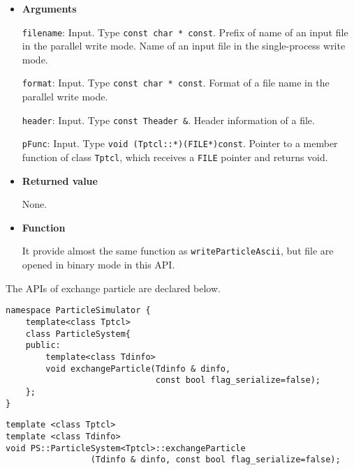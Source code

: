 \begin{itemize}

\item{{\bf Arguments}}

  \texttt{filename}: Input. Type \texttt{const char * const}. Prefix of name of an input file in the parallel write mode. Name of an input file in the single-process write mode.

  \texttt{format}: Input. Type \texttt{const char * const}. Format of a file name in the parallel write mode.

  \texttt{header}: Input. Type \texttt{const Theader \&}. Header information of a file.
  
  \texttt{pFunc}: Input. Type \texttt{void (Tptcl::*)(FILE*)const}. Pointer to a member function of class \texttt{Tptcl}, which receives a \texttt{FILE} pointer and returns void.


\item{{\bf Returned value}}

  None.

\item{{\bf Function}}

It provide almost the same function as \texttt{writeParticleAscii}, but file are opened in binary mode in this API.


\end{itemize}





The APIs of exchange particle are declared below.

\begin{lstlisting}[caption=ParticleSystem4]
namespace ParticleSimulator {
    template<class Tptcl>
    class ParticleSystem{
    public:
        template<class Tdinfo>
        void exchangeParticle(Tdinfo & dinfo,
                              const bool flag_serialize=false);
    };
}
\end{lstlisting}

\label{sec:particleSystem:exchangeParticle}

\begin{screen}
\begin{verbatim}
template <class Tptcl>
template <class Tdinfo>
void PS::ParticleSystem<Tptcl>::exchangeParticle
                 (Tdinfo & dinfo, const bool flag_serialize=false);
\end{verbatim}
\end{screen}

